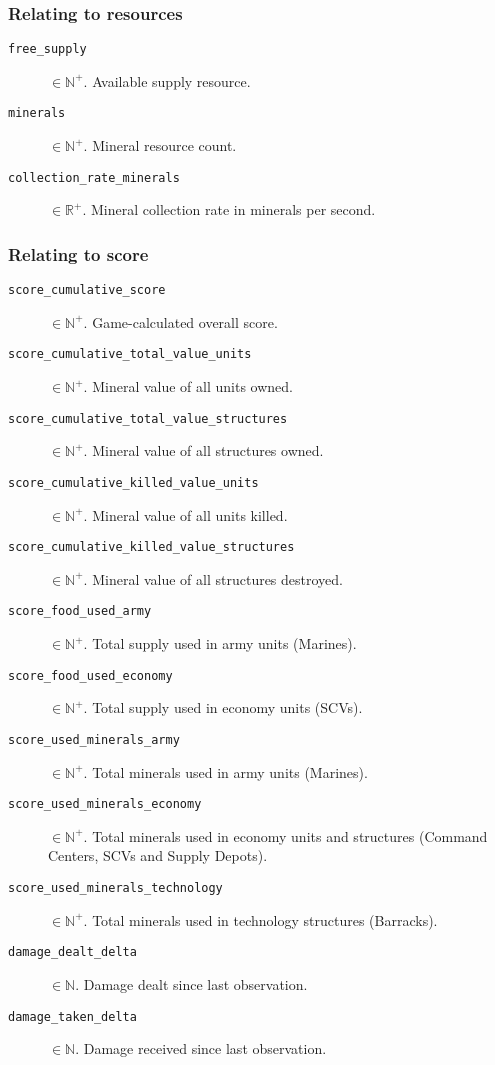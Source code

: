 \subsubsection*{Relating to resources}
\begin{description}
    \item[\texttt{free\_supply}] $\in \mathbb{N}^+$. Available supply resource.
    \item[\texttt{minerals}] $\in \mathbb{N}^+$. Mineral resource count.
    \item[\texttt{collection\_rate\_minerals}] $\in \mathbb{R}^+$. Mineral collection rate in minerals per second.
\end{description}

\subsubsection*{Relating to score}
\begin{description}
    \item[\texttt{score\_cumulative\_score}] $\in \mathbb{N}^+$. Game-calculated overall score.
    \item[\texttt{score\_cumulative\_total\_value\_units}] $\in \mathbb{N}^+$. Mineral value of all units owned.
    \item[\texttt{score\_cumulative\_total\_value\_structures}] $\in \mathbb{N}^+$. Mineral value of all structures owned.
    \item[\texttt{score\_cumulative\_killed\_value\_units}] $\in \mathbb{N}^+$. Mineral value of all units killed.
    \item[\texttt{score\_cumulative\_killed\_value\_structures}] $\in \mathbb{N}^+$. Mineral value of all structures destroyed.
    \item[\texttt{score\_food\_used\_army}] $\in \mathbb{N}^+$. Total supply used in army units (Marines).
    \item[\texttt{score\_food\_used\_economy}] $\in \mathbb{N}^+$. Total supply used in economy units (SCVs).
    \item[\texttt{score\_used\_minerals\_army}] $\in \mathbb{N}^+$. Total minerals used in army units (Marines).
    \item[\texttt{score\_used\_minerals\_economy}] $\in \mathbb{N}^+$. Total minerals used in economy units and structures (Command Centers, SCVs and Supply Depots).
    \item[\texttt{score\_used\_minerals\_technology}] $\in \mathbb{N}^+$. Total minerals used in technology structures (Barracks).
    \item[\texttt{damage\_dealt\_delta}] $\in \mathbb{N}$. Damage dealt since last observation.
    \item[\texttt{damage\_taken\_delta}] $\in \mathbb{N}$. Damage received since last observation.
\end{description}

